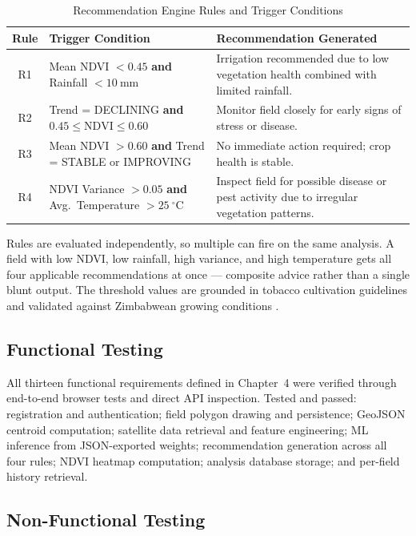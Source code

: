 \documentclass[12pt,a4paper]{report}
\begin{document}
\begin{table}[H]
  \centering
  \caption{Recommendation Engine Rules and Trigger Conditions}
  \label{tab:recrules}
  \begin{tabularx}{\textwidth}{c p{4.2cm} p{7.0cm}}
    \toprule
    \textbf{Rule} & \textbf{Trigger Condition} & \textbf{Recommendation Generated} \\
    \midrule
    R1 & Mean NDVI $< 0.45$ \textbf{and} Rainfall $< 10\ \text{mm}$ & Irrigation recommended due to low vegetation health combined with limited rainfall. \\[4pt]
    R2 & Trend = DECLINING \textbf{and} $0.45 \leq \text{NDVI} \leq 0.60$ & Monitor field closely for early signs of stress or disease. \\[4pt]
    R3 & Mean NDVI $> 0.60$ \textbf{and} Trend = STABLE or IMPROVING & No immediate action required; crop health is stable. \\[4pt]
    R4 & NDVI Variance $> 0.05$ \textbf{and} Avg.\ Temperature $> 25\ ^{\circ}\text{C}$ & Inspect field for possible disease or pest activity due to irregular vegetation patterns. \\
    \bottomrule
  \end{tabularx}
\end{table}

Rules are evaluated independently, so multiple can fire on the same analysis. A field with low NDVI, low rainfall, high variance, and high temperature gets all four applicable recommendations at once — composite advice rather than a single blunt output. The threshold values are grounded in tobacco cultivation guidelines and validated against Zimbabwean growing conditions \citep{timb2023}.

\subsection{Functional Testing}

All thirteen functional requirements defined in Chapter~4 were verified through end-to-end browser tests and direct API inspection. Tested and passed: registration and authentication; field polygon drawing and persistence; GeoJSON centroid computation; satellite data retrieval and feature engineering; ML inference from JSON-exported weights; recommendation generation across all four rules; NDVI heatmap computation; analysis database storage; and per-field history retrieval.

\subsection{Non-Functional Testing}
\end{document}
